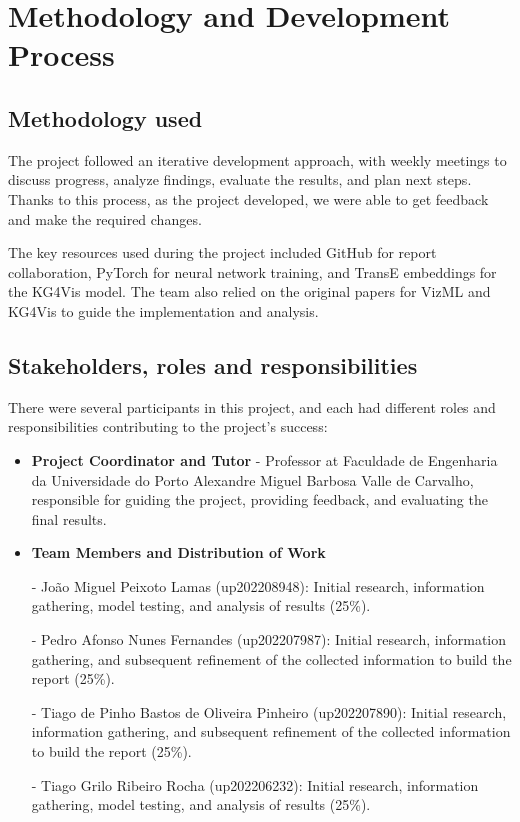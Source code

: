 
\section{Methodology and Development Process}

\subsection{Methodology used}

The project followed an iterative development approach, with weekly meetings to discuss progress, analyze findings, evaluate the results, and plan next steps.  Thanks to this process, as the project developed, we were able to get feedback and make the required changes. 

The key resources used during the project included GitHub for report collaboration, PyTorch for neural network training, and TransE embeddings for the KG4Vis model. The team also relied on the original papers for VizML and KG4Vis to guide the implementation and analysis.	

\subsection{Stakeholders, roles and responsibilities}


There were several participants in this project, and each had different roles and responsibilities contributing to the project's success:

\begin{itemize}
\item \textbf{Project Coordinator and Tutor} - Professor at Faculdade de Engenharia da Universidade do Porto Alexandre Miguel Barbosa Valle de Carvalho, responsible for guiding the project, providing feedback, and evaluating the final results.
\item \textbf{Team Members and Distribution of Work} 

- João Miguel Peixoto Lamas (up202208948): Initial research, information gathering, model testing, and analysis of results (25\%).

- Pedro Afonso Nunes Fernandes (up202207987): Initial research, information gathering, and subsequent refinement of the collected information to build the report (25\%).

- Tiago de Pinho Bastos de Oliveira Pinheiro (up202207890): Initial research, information gathering, and subsequent refinement of the collected information to build the report (25\%).

- Tiago Grilo Ribeiro Rocha (up202206232): Initial research, information gathering, model testing, and analysis of results (25\%).
\end{itemize}
\vspace{7cm}    

